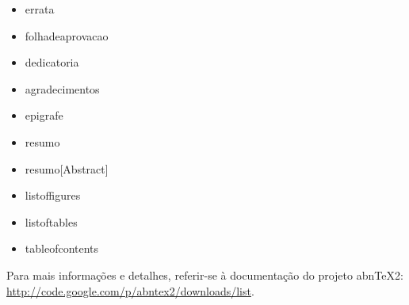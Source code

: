 \begin{multicols}{3}
\begin{itemize}
\item errata \item folhadeaprovacao \item dedicatoria \item agradecimentos \item epigrafe
\item resumo \item resumo[Abstract] \item listoffigures \item listoftables \item tableofcontents
\end{itemize}
\end{multicols}

Para mais informações e detalhes, referir-se à documentação do projeto abn\TeX 2: \url{http://code.google.com/p/abntex2/downloads/list}.